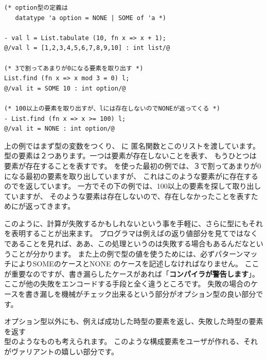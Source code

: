 \documentclass[11pt,a4paper]{jarticle}
\begin{document}
\begin{lstlisting}[caption=オプション型,label=code:option]
(* option型の定義は
   datatype 'a option = NONE | SOME of 'a *)

- val l = List.tabulate (10, fn x => x + 1);
@/val l = [1,2,3,4,5,6,7,8,9,10] : int list/@

(* 3で割ってあまりが0になる要素を取り出す *)
List.find (fn x => x mod 3 = 0) l;
@/val it = SOME 10 : int option/@

(* 100以上の要素を取り出すが、lには存在しないのでNONEが返ってくる *)
- List.find (fn x => x >= 100) l;
@/val it = NONE : int option/@
\end{lstlisting}

上の例ではまず型の変数をつくり、
に
匿名関数とこのリストを渡しています。
型の要素は２つあります。一つは要素が存在しないことを表す、
もうひとつは要素が存在することを表すです。
を使った最初の例では、３で割ってあまりが0になる最初の要素を取り出していますが、
これはこのような要素がに存在するのでを返しています。
一方でその下の例では、100以上の要素を探して取り出していますが、
そのような要素は存在しないので、存在しなかったことを表すためにが返ってきます。

このように、計算が失敗するかもしれないという事を手軽に、さらに型にもそれを表明することが出来ます。
プログラマは例えばの返り値部分を見てではなく
であることを見れば、ああ、この処理というのは失敗する場合もあるんだなということが分かります。
また上の例で型の値を使うためには、必ずパターンマッチによりSOMEのケースとNONE
のケースを記述しなければなりません。
ここが重要なのですが、書き漏らしたケースがあれば「{\bfseries コンパイラが警告します}」。
ここが他の失敗をエンコードする手段と全く違うところです。
失敗の場合のケースを書き漏しを機械がチェック出来るという部分がオプション型の良い部分です。

オプション型以外にも、例えば成功した時型の要素を返し、失敗した時型の要素を返す \\
型のようなものも考えられます。
このような構成要素をユーザが作れる、それがヴァリアントの嬉しい部分です。
\end{document}
